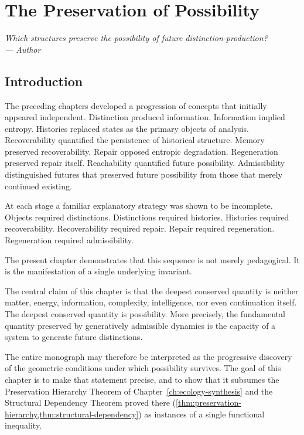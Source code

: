\documentclass[12pt,twoside,openright]{book}
\newenvironment{epigraph}[2]{%
  \vspace{1em}\begin{flushright}
  \begin{minipage}{0.72\textwidth}
  \itshape\small #1\\[0.4em]
  \upshape\footnotesize\sffamily\color{DistGray}--- #2
  \end{minipage}\end{flushright}\vspace{1.5em}}{}
\begin{document}
\chapter{The Preservation of Possibility}
\label{ch:preservation}
\begin{epigraph}{Which structures preserve the possibility
  of future distinction-production?}{Author}
\end{epigraph}

\section{Introduction}
\label{sec:ch31-intro}

The preceding chapters developed a progression of concepts
that initially appeared independent. Distinction produced
information. Information implied entropy. Histories
replaced states as the primary objects of analysis.
Recoverability quantified the persistence of historical
structure. Memory preserved recoverability. Repair opposed
entropic degradation. Regeneration preserved repair itself.
Reachability quantified future possibility. Admissibility
distinguished futures that preserved future possibility
from those that merely continued existing.

At each stage a familiar explanatory strategy was shown to
be incomplete. Objects required distinctions. Distinctions
required histories. Histories required recoverability.
Recoverability required repair. Repair required
regeneration. Regeneration required admissibility.

The present chapter demonstrates that this sequence is not
merely pedagogical. It is the manifestation of a single
underlying invariant.

The central claim of this chapter is that the deepest
conserved quantity is neither matter, energy, information,
complexity, intelligence, nor even continuation itself. The
deepest conserved quantity is possibility. More precisely,
the fundamental quantity preserved by generatively
admissible dynamics is the capacity of a system to generate
future distinctions.

The entire monograph may therefore be interpreted as the
progressive discovery of the geometric conditions under
which possibility survives. The goal of this chapter is to
make that statement precise, and to show that it subsumes
the Preservation Hierarchy Theorem of
Chapter~\ref{ch:ecology-synthesis} and the Structural Dependency
Theorem proved there
(\cref{thm:preservation-hierarchy,thm:structural-dependency})
as instances of a single functional inequality.
\end{document}
